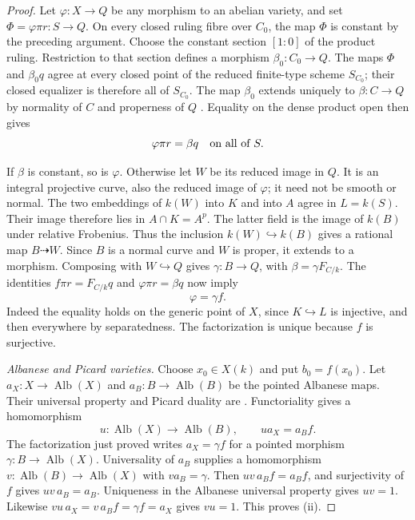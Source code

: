 \begin{proof}
Let $\varphi:X\to Q$ be any morphism to an abelian variety, and set
$\Phi=\varphi\pi r:S\to Q$.
On every closed ruling fibre over $C_0$, the map $\Phi$ is
constant by the preceding argument.
Choose the constant section $[1:0]$ of the product ruling.
Restriction to that section defines a morphism
$\beta_0:C_0\to Q$.
The maps $\Phi$ and $\beta_0q$ agree at every closed point of
the reduced finite-type scheme $S_{C_0}$; their closed equalizer
is therefore all of $S_{C_0}$.
The map $\beta_0$ extends uniquely to $\beta:C\to Q$ by
normality of $C$ and properness of $Q$
\cite[Tag~0BXZ]{Stacks}.
Equality on the dense product open then gives
\[
 \varphi\pi r=\beta q\quad\hbox{on all of }S.
\]

If $\beta$ is constant, so is $\varphi$.
Otherwise let $W$ be its reduced image in $Q$.
It is an integral projective curve, also the reduced image of
$\varphi$; it need not be smooth or normal.
The two embeddings of $k(W)$ into $K$ and into $A$ agree in
$L=k(S)$. Their image therefore lies in
$A\cap K=A^p$.
The latter field is the image of $k(B)$ under relative Frobenius.
Thus the inclusion $k(W)\hookrightarrow k(B)$ gives a rational
map $B\dashrightarrow W$.
Since $B$ is a normal curve and $W$ is proper, it extends to a
morphism. Composing with $W\hookrightarrow Q$ gives
$\gamma:B\to Q$, with $\beta=\gamma F_{C/k}$.
The identities
$f\pi r=F_{C/k}q$ and $\varphi\pi r=\beta q$ now imply
\[
 \varphi=\gamma f.
\]
Indeed the equality holds on the generic point of $X$, since
$K\hookrightarrow L$ is injective, and then everywhere by
separatedness. The factorization is unique because $f$ is
surjective.

\emph{Albanese and Picard varieties.}
Choose $x_0\in X(k)$ and put $b_0=f(x_0)$.
Let $a_X:X\to\operatorname{Alb}(X)$ and
$a_B:B\to\operatorname{Alb}(B)$ be the pointed Albanese maps.
Their universal property and Picard duality are
\cite[Expos\'e~236, Corollary~3.2 and Theorem~3.3(iii),
pp.~236--238]{FGAPicard}.
Functoriality gives a homomorphism
\[
 u:\operatorname{Alb}(X)\to\operatorname{Alb}(B),
 \qquad ua_X=a_Bf.
\]
The factorization just proved writes $a_X=\gamma f$ for a
pointed morphism $\gamma:B\to\operatorname{Alb}(X)$.
Universality of $a_B$ supplies a homomorphism
$v:\operatorname{Alb}(B)\to\operatorname{Alb}(X)$ with
$va_B=\gamma$.
Then $uv\,a_Bf=a_Bf$, and surjectivity of $f$ gives
$uv\,a_B=a_B$.
Uniqueness in the Albanese universal property gives $uv=1$.
Likewise
$vu\,a_X=v\,a_Bf=\gamma f=a_X$ gives $vu=1$.
This proves (ii).


\end{proof}
